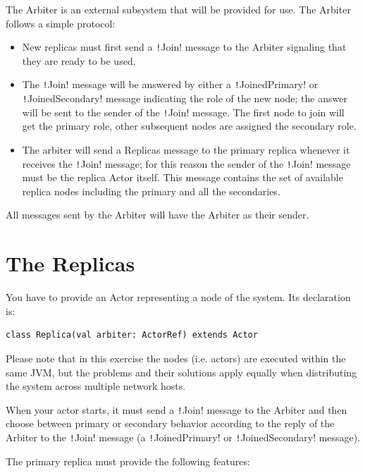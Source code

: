 \documentclass{article}
\begin{document}
The Arbiter is an external subsystem that will be provided for use. The Arbiter follows a simple protocol:

\begin{itemize}
    \item New replicas must first send a \texttt!Join! message to the Arbiter signaling that they are ready to be used.
    \item The \texttt!Join! message will be answered by either a \texttt!JoinedPrimary! or \texttt!JoinedSecondary! message indicating the role of the new node; the answer will be sent to the sender of the \texttt!Join! message. The first node to join will get the primary role, other subsequent nodes are assigned the secondary role.
    \item The arbiter will send a Replicas message to the primary replica whenever it receives the \texttt!Join! message; for this reason the sender of the \texttt!Join! message must be the replica Actor itself. This message contains the set of available replica nodes including the primary and all the secondaries.
\end{itemize}

All messages sent by the Arbiter will have the Arbiter as their sender.

\section{The Replicas}\label{s:replicas}

You have to provide an Actor representing a node of the system. Its declaration is:

\begin{verbatim}
class Replica(val arbiter: ActorRef) extends Actor 
\end{verbatim}

Please note that in this exercise the nodes (i.e. actors) are executed within the same JVM, but the problems and their solutions apply equally when distributing the system across multiple network hosts.

When your actor starts, it must send a \texttt!Join! message to the Arbiter and then choose between primary or secondary behavior according to the reply of the Arbiter to the \texttt!Join! message (a \texttt!JoinedPrimary! or \texttt!JoinedSecondary! message).

The primary replica must provide the following features:
\end{document}
